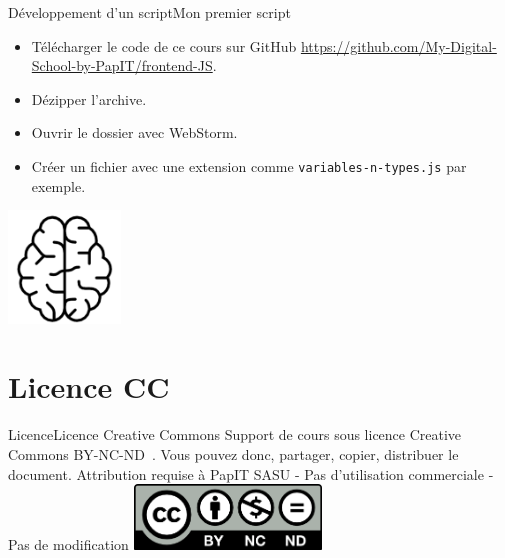 \documentclass{beamer}
\begin{document}
    \begin{frame}{Développement d'un script}{Mon premier script}
        \begin{itemize}
            \item Télécharger le code de ce cours sur GitHub \url{https://github.com/My-Digital-School-by-PapIT/frontend-JS}.
            \item Dézipper l'archive.
            \item Ouvrir le dossier avec WebStorm.
            \item Créer un fichier avec une extension comme \lstinline{variables-n-types.js} par exemple.
        \end{itemize}
        \bigbreak
        \centering
        \includegraphics[width=3cm]{image/intelligence}
    \end{frame}


    \section{Licence CC}\label{sec:licence}

    \begin{frame}{Licence}{Licence Creative Commons}
        Support de cours sous licence Creative Commons BY-NC-ND~.
        \bigbreak
        Vous pouvez donc, partager, copier, distribuer le document.
        \bigbreak
        Attribution requise à PapIT SASU - Pas d’utilisation commerciale - Pas de modification
        \bigbreak
        \centering
        \includegraphics[width=5cm]{image/by-nc-nd-logo}
    \end{frame}
\end{document}
